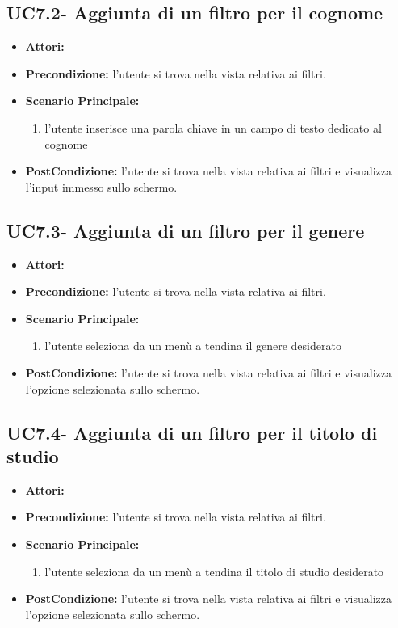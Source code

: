 \subsection{UC7.2- Aggiunta di un filtro per il cognome}
\begin{itemize}
	\item \textbf{Attori:}\loggedusr
	\item \textbf{Precondizione:} l'utente si trova nella vista relativa ai filtri.
	\item \textbf{Scenario Principale:}
	\begin{enumerate}
		\item l'utente inserisce una parola chiave in un campo di testo dedicato al cognome
	\end{enumerate}
	\item \textbf{PostCondizione:}  l'utente si trova nella vista relativa ai filtri e visualizza l'input immesso sullo schermo.
\end{itemize}

\subsection{UC7.3- Aggiunta di un filtro per il genere}
\begin{itemize}
	\item \textbf{Attori:}\loggedusr
	\item \textbf{Precondizione:} l'utente si trova nella vista relativa ai filtri.
	\item \textbf{Scenario Principale:}
	\begin{enumerate}
		\item l'utente seleziona da un menù a tendina il genere desiderato
	\end{enumerate}
	\item \textbf{PostCondizione:}  l'utente si trova nella vista relativa ai filtri e visualizza l'opzione selezionata sullo schermo.
\end{itemize}

\subsection{UC7.4- Aggiunta di un filtro per il titolo di studio}
\begin{itemize}
	\item \textbf{Attori:}\loggedusr
	\item \textbf{Precondizione:} l'utente si trova nella vista relativa ai filtri.
	\item \textbf{Scenario Principale:}
	\begin{enumerate}
		\item l'utente seleziona da un menù a tendina il titolo di studio desiderato
	\end{enumerate}
	\item \textbf{PostCondizione:}  l'utente si trova nella vista relativa ai filtri e visualizza l'opzione selezionata sullo schermo.
\end{itemize}
